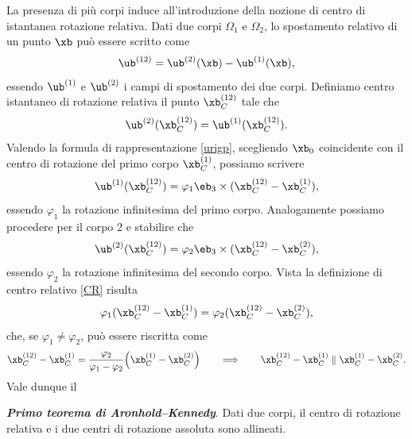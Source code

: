 La presenza di più corpi induce all'introduzione della nozione di centro di istantanea rotazione relativa. Dati due corpi $\Omega_1$ e $\Omega_2$, lo spostamento relativo di un punto $\xb$ può essere scritto come
\begin{equation}\label{CR}
\ub^{(12)}=\ub^{(2)}(\xb)-\ub^{(1)}(\xb),
\end{equation}
essendo $\ub^{(1)}$ e $\ub^{(2)}$ i campi di spostamento dei due corpi. Definiamo centro istantaneo di rotazione relativa il punto $\xb_C^{(12)}$ tale che
\begin{equation}
\ub^{(2)}(\xb_C^{(12)})=\ub^{(1)}(\xb_C^{(12)}).
\end{equation}
Valendo la formula di rappresentazione \eqref{urigp}, scegliendo $\xb_0$ coincidente con il centro di rotazione del primo corpo $\xb_C^{(1)}$, possiamo scrivere
\begin{equation}
\ub^{(1)}(\xb_C^{(12)})=\varphi_1 \eb_3 \times (\xb_C^{(12)}-\xb_C^{(1)}),
\end{equation}
essendo $\varphi_1$ la rotazione infinitesima del primo corpo.
Analogamente possiamo procedere per il corpo 2 e stabilire che
\begin{equation}
	\ub^{(2)}(\xb_C^{(12)})=\varphi_2 \eb_3 \times (\xb_C^{(12)}-\xb_C^{(2)}),
\end{equation}
essendo $\varphi_2$ la rotazione infinitesima del secondo corpo.
Vista la definizione di centro relativo \eqref{CR} risulta
\begin{equation}
\varphi_1  (\xb_C^{(12)}-\xb_C^{(1)})=\varphi_2  (\xb_C^{(12)}-\xb_C^{(2)}),
\end{equation}
che, se $\varphi_1\neq \varphi_2$,  può essere riscritta come
\begin{equation}
\xb_C^{(12)}-\xb_C^{(1)}=\frac{\varphi_2}{\varphi_1-\varphi_2}\Big(  \xb_C^{(1)} -\xb_C^{(2)}\Big) \qquad \Longrightarrow \qquad \xb_C^{(12)}-\xb_C^{(1)}\parallel \xb_C^{(1)} -\xb_C^{(2)}.
\end{equation}
Vale dunque il 
\begin{definition}
\textit{\textbf{Primo teorema di Aronhold--Kennedy}}. Dati due corpi, il centro di rotazione relativa e i due centri di rotazione assoluta sono allineati.
\end{definition}

